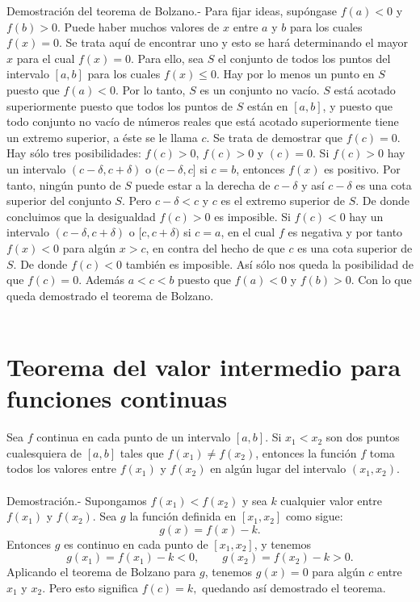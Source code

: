 Demostración del teorema de Bolzano.- Para fijar ideas, supóngase $f(a)<0$ y $f(b)>0$. Puede haber muchos valores de $x$ entre $a$ y $b$ para los cuales $f(x)=0$. Se trata aquí de encontrar uno y esto se hará determinando el mayor $x$ para el cual $f(x)=0$. Para ello, sea $S$ el conjunto de todos los puntos del intervalo $[a,b]$ para los cuales $f(x)\leq 0$. Hay por lo menos un punto en $S$ puesto que $f(a)<0$. Por lo tanto, $S$ es un conjunto no vacío. $S$ está acotado superiormente puesto que todos los puntos de $S$ están en $[a,b]$, y puesto que todo conjunto no vacío de números reales que está acotado superiormente tiene un extremo superior, a éste se le llama $c$. Se trata de demostrar que $f(c)=0$.\\
Hay sólo tres posibilidades: $f(c)>0$, $f(c)>0$ y $(c)=0$. Si $f(c)>0$ hay un intervalo $(c-\delta,c+\delta)$  o $(c-\delta,c]$ si $c=b$, entonces $f(x)$ es positivo. Por tanto, ningún punto de $S$ puede estar a la derecha de $c-\delta$ y así $c-\delta$ es una cota superior del conjunto $S$. Pero $c-\delta < c$ y $c$ es el extremo superior de $S$. De donde concluimos que la desigualdad $f(c)>0$ es imposible. Si $f(c)<0$ hay un intervalo $(c-\delta,c+\delta)$ o $[c,c+\delta)$ si $c=a$, en el cual $f$ es negativa y por tanto $f(x)<0$ para algún $x>c$, en contra del hecho de que $c$ es una cota superior de $S$. De donde $f(c)<0$ también es imposible. Así sólo nos queda la posibilidad de que $f(c)=0$. Además $a<c<b$ puesto que $f(a)<0$ y $f(b)>0$. Con lo que queda demostrado el teorema de Bolzano.\\\\


\section{Teorema del valor intermedio para funciones continuas}

\begin{teo}
    Sea $f$ continua en cada punto de un intervalo $[a,b]$. Si $x_1<x_2$ son dos puntos cualesquiera de $[a,b]$ tales que $f(x_1)\neq f(x_2)$, entonces la función $f$ toma todos los valores entre $f(x_1)$ y $f(x_2)$ en algún lugar del intervalo $(x_1,x_2)$.\\\\
	Demostración.-\; Supongamos $f(x_1)<f(x_2)$ y sea $k$ cualquier valor entre $f(x_1)$ y $f(x_2)$. Sea $g$ la función definida en $[x_1,x_2]$ como sigue:
	$$g(x)=f(x)-k.$$
	Entonces $g$ es continuo en cada punto de $[x_1,x_2]$, y tenemos
	$$g(x_1)=f(x_1)-k<0,\qquad g(x_2)=f(x_2)-k>0.$$
	Aplicando el teorema de Bolzano para $g$, tenemos $g(x)=0$ para algún $c$ entre $x_1$ y $x_2$. Pero esto significa $f(c)=k,$ quedando así demostrado el teorema.\\\\
\end{teo}

